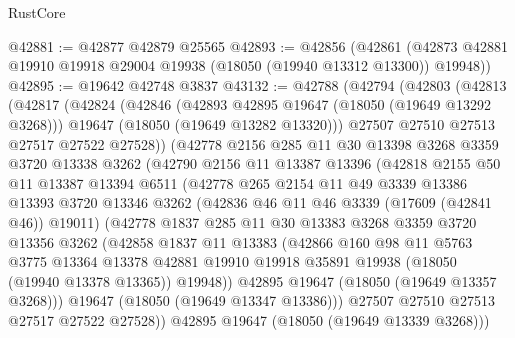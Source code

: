 \begin{lexlean}{RustCore}
\begin{coremodule}
@42881 := @42877 @42879 @25565
@42893 := @42856
    (@42861 (@42873 @42881 @19910 @19918 @29004 @19938 (@18050 (@19940 @13312 @13300)) @19948))
@42895 := @19642 @42748 @3837
@43132 := @42788
    (@42794
      (@42803
        (@42813
          (@42817
            (@42824
              (@42846
                (@42893 @42895 @19647 (@18050 (@19649 @13292 @3268)))
                @19647
                (@18050 (@19649 @13282 @13320)))
              @27507
              @27510
              @27513
              @27517
              @27522
              @27528))
          (@42778
            @2156
            @285
            @11
            @30
            @13398
            @3268
            @3359
            @3720
            @13338
            @3262
            (@42790
              @2156
              @11
              @13387
              @13396
              (@42818
                @2155
                @50
                @11
                @13387
                @13394
                @6511
                (@42778
                  @265
                  @2154
                  @11
                  @49
                  @3339
                  @13386
                  @13393
                  @3720
                  @13346
                  @3262
                  (@42836 @46 @11 @46 @3339 (@17609 (@42841 @46)) @19011)
                  (@42778
                    @1837
                    @285
                    @11
                    @30
                    @13383
                    @3268
                    @3359
                    @3720
                    @13356
                    @3262
                    (@42858
                      @1837
                      @11
                      @13383
                      (@42866
                        @160
                        @98
                        @11
                        @5763
                        @3775
                        @13364
                        @13378
                        @42881
                        @19910
                        @19918
                        @35891
                        @19938
                        (@18050 (@19940 @13378 @13365))
                        @19948))
                    @42895
                    @19647
                    (@18050 (@19649 @13357 @3268)))
                  @19647
                  (@18050 (@19649 @13347 @13386)))
                @27507
                @27510
                @27513
                @27517
                @27522
                @27528))
            @42895
            @19647
            (@18050 (@19649 @13339 @3268)))

\end{coremodule}
\end{lexlean}
